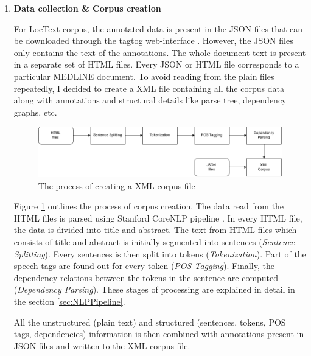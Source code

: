 \begin{enumerate}

\item \textbf{Data collection \& Corpus creation}

For LocText corpus, the annotated data is present in the JSON files that can be downloaded through the tagtog web-interface \cite{cejuela2014tagtog}. However, the JSON files only contains the text of the annotations. The whole document text is present in a separate set of HTML files. Every JSON or HTML file corresponds to a particular MEDLINE \cite{medline} document. To avoid reading from the plain files repeatedly, I decided to create a XML file containing all the corpus data along with annotations and structural details like parse tree, dependency graphs, etc.

\begin{figure}
\centering
\includegraphics[scale=0.4]{figures/Corpus_Creation.png}
\caption{The process of creating a XML corpus file}\label{fig:corpusCreation}
\end{figure}

Figure \ref{fig:corpusCreation} outlines the process  of corpus creation. The data read from the HTML files is parsed using Stanford CoreNLP pipeline \cite{manning2014stanford}. In every HTML file, the data is divided into title and abstract. The text from HTML files which consists of title and abstract is initially segmented into sentences (\textit{Sentence Splitting}). Every sentences is then split into tokens (\textit{Tokenization}). Part of the speech tags are found out for every token (\textit{POS Tagging}). Finally, the dependency relations between the tokens in the sentence are computed (\textit{Dependency Parsing}). These stages of processing are explained in detail in the section \ref{sec:NLPPipeline}.

All the unstructured (plain text) and structured (sentences, tokens, POS tags, dependencies) information is then combined with annotations present in JSON files and written to the XML corpus file.


\end{enumerate}
